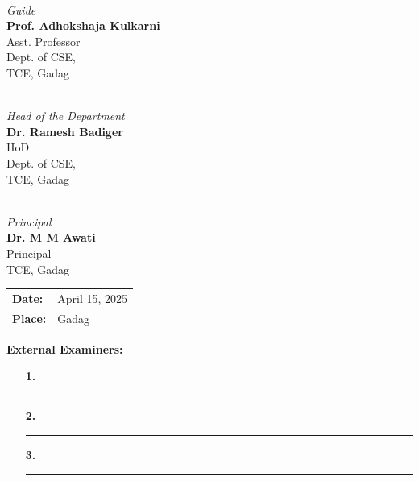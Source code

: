 \begin{minipage}[t]{0.3\textwidth}
    \centering
    \vspace{1.2cm}
    \hrulefill \\
    \emph{Guide}\\[0.15cm]
    \textbf{Prof. Adhokshaja Kulkarni}\\
    Asst. Professor\\
    Dept. of CSE,\\
    TCE, Gadag
\end{minipage}
\hfill
\begin{minipage}[t]{0.3\textwidth}
    \centering
    \vspace{1.2cm}
    \hrulefill \\
    \emph{Head of the Department}\\[0.15cm]
    \textbf{Dr. Ramesh Badiger}\\
    HoD\\
    Dept. of CSE,\\
    TCE, Gadag
\end{minipage}
\hfill
\begin{minipage}[t]{0.3\textwidth}
    \centering
    \vspace{1.2cm}
    \hrulefill \\
    \emph{Principal}\\[0.15cm]
    \textbf{Dr. M M Awati} \\
    Principal \\
    TCE, Gadag
\end{minipage}

\vspace{1cm}

\begin{minipage}[t]{0.45\textwidth}
    \vspace{0.4cm}
    \begin{tabular}{@{}ll}
        \textbf{Date:}  & April 15, 2025 \\
        \textbf{Place:} & Gadag
    \end{tabular}
\end{minipage}
\hfill
\begin{minipage}[t]{0.45\textwidth}
    \textbf{External Examiners:}
    \begin{itemize}
        \item[\textbf{1.}] \rule{5.5cm}{0.4pt}
        \item[\textbf{2.}] \rule{5.5cm}{0.4pt}
        \item[\textbf{3.}] \rule{5.5cm}{0.4pt}
    \end{itemize}
\end{minipage}